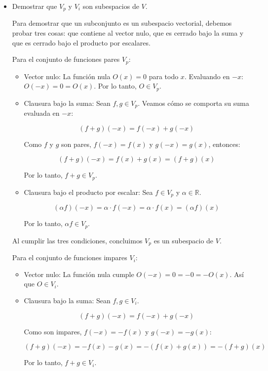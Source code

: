 \documentclass[11pt,spanish]{article}
\begin{document}
\begin{itemize}
\item Demostrar que $V_p$ y $V_i$ son subespacios de $V$.

Para demostrar que un subconjunto es un subespacio vectorial, debemos probar tres cosas: que contiene al vector nulo, que es cerrado bajo la suma y que es cerrado bajo el producto por escalares.

Para el conjunto de funciones pares $V_p$:

\begin{itemize}
\item Vector nulo: La función nula $O(x) = 0$ para todo $x$. Evaluando en $-x$: $O(-x) = 0 = O(x)$. Por lo tanto, $O \in V_p$.
\item Clausura bajo la suma: Sean $f, g \in V_p$. Veamos cómo se comporta su suma evaluada en $-x$:

$$(f+g)(-x) = f(-x) + g(-x)$$

Como $f$ y $g$ son pares, $f(-x)=f(x)$ y $g(-x)=g(x)$, entonces:

$$(f+g)(-x) = f(x) + g(x) = (f+g)(x)$$

Por lo tanto, $f+g \in V_p$.

\item Clausura bajo el producto por escalar: Sea $f \in V_p$ y $\alpha \in \mathbb{R}$.

$$(\alpha f)(-x) = \alpha \cdot f(-x) = \alpha \cdot f(x) = (\alpha f)(x)$$

Por lo tanto, $\alpha f \in V_p$.

\end{itemize}

Al cumplir las tres condiciones, concluimos $V_p$ es un subespacio de $V$.

Para el conjunto de funciones impares $V_i$:

\begin{itemize}

\item Vector nulo: La función nula cumple $O(-x) = 0 = -0 = -O(x)$. Así que $O \in V_i$.

\item Clausura bajo la suma: Sean $f, g \in V_i$.

$$(f+g)(-x) = f(-x) + g(-x)$$

Como son impares, $f(-x)=-f(x)$ y $g(-x)=-g(x)$:

$$(f+g)(-x) = -f(x) - g(x) = -(f(x) + g(x)) = -(f+g)(x)$$

Por lo tanto, $f+g \in V_i$.


\end{itemize}
\end{itemize}
\end{document}
